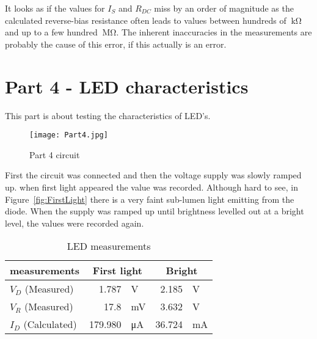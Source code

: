 \documentclass{article}
\begin{document}
It looks as if the values for \(I_S\) and \(R_{DC}\) miss by an order of magnitude as the calculated reverse-bias resistance often leads to values between hundreds of \(\SI{}{\kilo\ohm}\) and up to a few hundred \(\SI{}{\mega\ohm}\). The inherent inaccuracies in the measurements are probably the cause of this error, if this actually is an error.


\section{Part 4 - LED characteristics}
This part is about testing the characteristics of LED's. 


\begin{figure}[h]
    \centering
    \texttt{[image: Part4.jpg]}
    \caption{Part 4 circuit}
    \label{fig:Part4}
\end{figure}

First the circuit was connected and then the voltage supply was slowly ramped up. when first light appeared the value was recorded. Although hard to see, in Figure~\ref{fig:FirstLight} there is a very faint sub-lumen light emitting from the diode. When the supply was ramped up until brightness levelled out at a bright level, the values were recorded again.

\clearpage


\begin{table}[htbp]
  \centering
  \caption{LED measurements}
    \begin{tabular}{|l|rl|rl|}
    \hline
    measurements & \multicolumn{2}{c|}{First light} & \multicolumn{2}{c|}{Bright} \bigstrut\\
    \hline
    \(V_D\) (Measured)   & 1.787   & V   & 2.185  & V \bigstrut\\
    \hline
    \(V_R\) (Measured)   & 17.8    & mV  & 3.632  & V \bigstrut\\
    \hline
    \(I_D\) (Calculated) & 179.980 & μA  & 36.724 & mA \bigstrut\\
    \hline
    \end{tabular}%
  \label{tab:part4}%
\end{table}%
\end{document}
